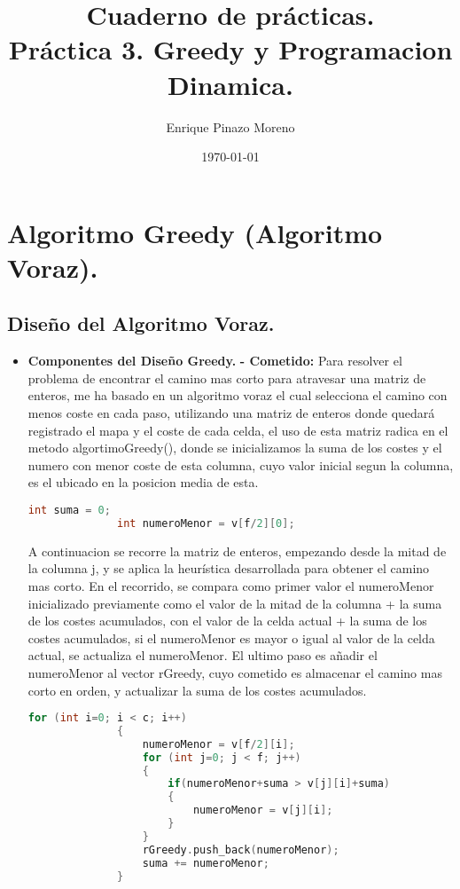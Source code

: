 \documentclass[12pt, letterpaper]{article}
\title{Cuaderno de prácticas. \\Práctica 3. Greedy y Programacion Dinamica.}
\author{Enrique Pinazo Moreno}
\date{\today}
\begin{document}
  \maketitle
  \tableofcontents
  \newpage %

  \section{Algoritmo Greedy (Algoritmo Voraz).}
    \subsection{Diseño del Algoritmo Voraz.}
      \begin{itemize}
        \item \textbf{Componentes del Diseño Greedy.}
          \subitem\textbf{- Cometido:}
            Para resolver el problema de encontrar el camino mas corto para atravesar una matriz de enteros, me ha basado en un algoritmo voraz el cual selecciona 
            el camino con menos coste en cada paso, utilizando una matriz de enteros donde quedará registrado el mapa y el coste de cada celda, el uso de esta matriz
            radica en el metodo algortimoGreedy(), donde se inicializamos la suma de los costes y el numero con menor coste de esta columna, cuyo valor inicial segun la columna,
            es el ubicado en la posicion media de esta.
            \begin{lstlisting}[language=C++]
              int suma = 0;
              int numeroMenor = v[f/2][0];
            \end{lstlisting}
            A continuacion se recorre la matriz de enteros, empezando desde la mitad de la columna j, y se aplica la heurística desarrollada para obtener el camino mas corto.
            En el recorrido, se compara como primer valor el numeroMenor inicializado previamente como el valor de la mitad de la columna + la suma de los costes acumulados,
            con el valor de la celda actual + la suma de los costes acumulados, si el numeroMenor es mayor o igual al valor de la celda actual, se actualiza el numeroMenor.
            \newline
            El ultimo paso es añadir el numeroMenor al vector rGreedy, cuyo cometido es almacenar el camino mas corto en orden, y actualizar la suma de los costes acumulados.
            
            \begin{lstlisting}[language=C++,basicstyle=\ttfamily\footnotesize]
              for (int i=0; i < c; i++)
              {
                  numeroMenor = v[f/2][i];
                  for (int j=0; j < f; j++)
                  {
                      if(numeroMenor+suma > v[j][i]+suma)
                      {
                          numeroMenor = v[j][i];
                      }
                  }
                  rGreedy.push_back(numeroMenor);
                  suma += numeroMenor;
              }
            \end{lstlisting}


\end{itemize}
\end{document}
